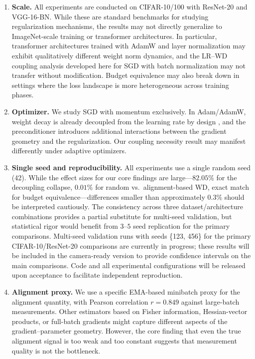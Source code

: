 \documentclass{article}
\begin{document}
\begin{enumerate}
  \item \textbf{Scale.}
        All experiments are conducted on CIFAR-10/100 with ResNet-20 and VGG-16-BN.
        While these are standard benchmarks for studying regularization mechanisms,
        the results may not directly generalize to ImageNet-scale training or
        transformer architectures.
        In particular, transformer architectures trained with AdamW and layer
        normalization may exhibit qualitatively different weight norm dynamics, and
        the LR--WD coupling analysis developed here for SGD with batch normalization
        may not transfer without modification.
        Budget equivalence may also break down in settings where the loss landscape
        is more heterogeneous across training phases.

  \item \textbf{Optimizer.}
        We study SGD with momentum exclusively.
        In Adam/AdamW, weight decay is already decoupled from the learning rate by
        design \citep{loshchilov2019decoupled}, and the preconditioner introduces
        additional interactions between the gradient geometry and the regularization.
        Our coupling necessity result may manifest differently under adaptive
        optimizers.

  \item \textbf{Single seed and reproducibility.}
        All experiments use a single random seed (42).
        While the effect sizes for our core findings are large---$82.05\%$ for the
        decoupling collapse, $0.01\%$ for random vs.\ alignment-based WD, exact match
        for budget equivalence---differences smaller than approximately $0.3\%$
        should be interpreted cautiously.
        The consistency across three dataset/architecture combinations provides a
        partial substitute for multi-seed validation, but statistical rigor would
        benefit from $3$--$5$ seed replication for the primary comparisons.
        Multi-seed validation runs with seeds \{123, 456\} for the primary CIFAR-10/ResNet-20
        comparisons are currently in progress; these results will be included in the
        camera-ready version to provide confidence intervals on the main comparisons.
        Code and all experimental configurations will be released upon acceptance to
        facilitate independent reproduction.

  \item \textbf{Alignment proxy.}
        We use a specific EMA-based minibatch proxy for the alignment quantity, with
        Pearson correlation $r = 0.849$ against large-batch measurements.
        Other estimators based on Fisher information, Hessian-vector products, or
        full-batch gradients might capture different aspects of the
        gradient--parameter geometry.
        However, the core finding that even the true alignment signal is too weak and
        too constant suggests that measurement quality is not the bottleneck.


\end{enumerate}
\end{document}
